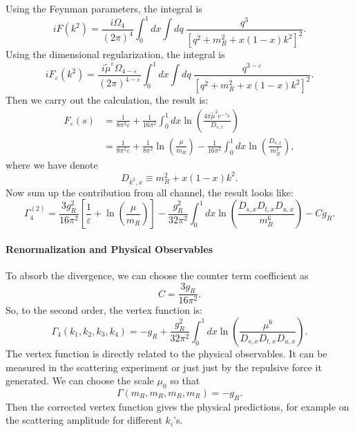 \documentclass[aps,prb,superscriptaddress,nofootinbib]{revtex4}
\begin{document}
Using the Feynman parameters, the integral is
\begin{equation}
	iF(k^2) = \frac{i\Omega_4}{(2\pi)^4} \int_0^1 dx \int dq\ \frac{q^{3}}{\left[q^2+m_R^2+x(1-x)k^2\right]^2}.
\end{equation}
Using the dimensional regularization, the integral is
\begin{equation}
	iF_\varepsilon(k^2) = \frac{i\tilde{\mu}^{\varepsilon}\Omega_{4-\varepsilon}}{(2\pi)^{4-\varepsilon}} \int_0^1 dx \int dq\ \frac{q^{3-\varepsilon}}{\left[q^2+m_R^2+x(1-x)k^2\right]^2}.
\end{equation}
Then we carry out the calculation, the result is:
\begin{equation}
\begin{aligned}
	F_\varepsilon(s) &= \frac{1}{8\pi^2\varepsilon} + \frac{1}{16\pi^2}\int_0^1 dx \ln \left(\frac{4\pi \tilde{\mu}^2 e^{-\gamma_E}}{D_{s,x}}\right) \\
	&= \frac{1}{8\pi^2\varepsilon} +\frac{1}{8\pi^2}\ln \left(\frac{\mu}{m_R}\right) - \frac{1}{16\pi^2}\int_0^1 dx \ln\left(\frac{D_{s,x}}{m_R^2}\right),
\end{aligned}
\end{equation}
where we have denote
\begin{equation}
	D_{k^2,x} \equiv m_R^2+x(1-x)k^2.
\end{equation}
Now sum up the contribution from all channel, the result looks like:
\begin{equation}
	\Gamma^{(2)}_4 = \frac{3 g_R^2}{16\pi^2}\left[\frac{1}{\varepsilon} + \ln\left(\frac{\mu}{m_R}\right)\right] - \frac{g_R^2}{32\pi^2}\int_0^1 dx \ln\left(\frac{D_{s,x}D_{t,x}D_{u,x}}{m_R^6}\right)- C g_R.
\end{equation}


\paragraph*{Renormalization and Physical Observables}

To absorb the divergence, we can choose the counter term coefficient as
\begin{equation}
	C = \frac{3g_R}{16\pi^2}.
\end{equation}
So, to the second order, the vertex function is:
\begin{equation}
	\Gamma_4(k_1,k_2,k_3,k_4) = -g_R + \frac{g_R^2}{32\pi^2}\int_0^1 dx \ln\left(\frac{\mu^6}{D_{s,x}D_{t,x}D_{u,x}}\right).
\end{equation}
The vertex function is directly related to the physical observables.
It can be measured in the scattering experiment or just just by the repulsive force it generated.
We can choose the scale $\mu_0$ so that
\begin{equation}
	\Gamma(m_R,m_R,m_R,m_R) = -g_R.
\end{equation}
Then the corrected vertex function gives the physical predictions, for example on the scattering amplitude for different $k_i$'s.
\end{document}
